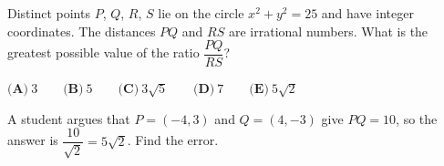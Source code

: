 Distinct points $P$, $Q$, $R$, $S$ lie on the circle $x^2+y^2=25$ and have integer coordinates. The distances $PQ$ and $RS$ are irrational numbers. What is the greatest possible value of the ratio $\dfrac{PQ}{RS}$?

$\textbf{(A)}\ 3\qquad\textbf{(B)}\ 5\qquad\textbf{(C)}\ 3\sqrt5\qquad\textbf{(D)}\ 7\qquad\textbf{(E)}\ 5\sqrt2$

A student argues that $P=(-4,3)$ and $Q=(4,-3)$ give $PQ=10$, so the answer is $\dfrac{10}{\sqrt2}=5\sqrt2$. Find the error.
